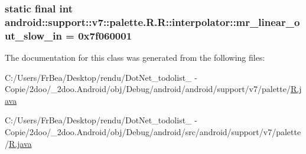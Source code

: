 \hypertarget{classandroid_1_1support_1_1v7_1_1palette_1_1_r_1_1interpolator_c75ef5fe6f5e1173a9b60706cb080a9c}{
\subsubsection[{mr\_\-linear\_\-out\_\-slow\_\-in}]{\setlength{\rightskip}{0pt plus 5cm}static final int android::support::v7::palette.R.R::interpolator::mr\_\-linear\_\-out\_\-slow\_\-in = 0x7f060001}}
\label{classandroid_1_1support_1_1v7_1_1palette_1_1_r_1_1interpolator_c75ef5fe6f5e1173a9b60706cb080a9c}




The documentation for this class was generated from the following files:\begin{CompactItemize}
\item 
C:/Users/FrBea/Desktop/rendu/DotNet\_\-todolist\_ - Copie/2doo/\_\-2doo.Android/obj/Debug/android/android/support/v7/palette/\hyperlink{android_2support_2v7_2palette_2_r_8java}{R.java}\item 
C:/Users/FrBea/Desktop/rendu/DotNet\_\-todolist\_ - Copie/2doo/\_\-2doo.Android/obj/Debug/android/src/android/support/v7/palette/\hyperlink{src_2android_2support_2v7_2palette_2_r_8java}{R.java}\end{CompactItemize}
